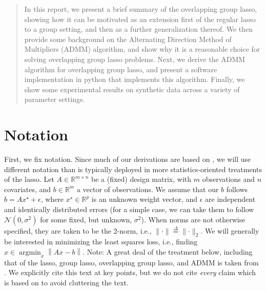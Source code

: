 \documentclass{article}
\begin{document}
\maketitle

\begin{abstract}
  In this report, we present a brief summary of the overlapping group lasso, showing how it can be motivated as an extension first of the regular lasso to a group setting, and then as a further generalization thereof.
  We then provide some background on the Alternating Direction Method of Multipliers (ADMM) algorithm, and show why it is a reasonable choice for solving overlapping group lasso problems.
  Next, we derive the ADMM algorithm for overlapping group lasso, and present a software implementation in python that implements this algorithm.
  Finally, we show some experimental results on synthetic data across a variety of parameter settings.
\end{abstract}

\section{Notation}
\label{sec:notation}

First, we fix notation.
Since much of our derivations are based on \cite{boyd_distributed_2011}, we will use different notation than is typically deployed in more statistics-oriented treatments of the lasso.
Let $A \in \mathbb{R}^{m \times n}$ be a (fixed) design matrix, with $m$ observations and $n$ covariates, and $b \in \mathbb{R}^m$ a vector of observations.
We assume that our $b$ follows $b = A x^{\star} + \epsilon$, where $x^{\star} \in \mathbb{R}^p$ is an unknown weight vector, and $\epsilon$ are independent and identically distributed errors (for a simple case, we can take them to follow $\mathcal{N}(0,\sigma^2)$ for some fixed, but unknown, $\sigma^2$).
When norms are not otherwise specified, they are taken to be the 2-norm, i.e., $\lVert \cdot \rVert \overset{\Delta}{=} \lVert \cdot \rVert_2$.
We will generally be interested in minimizing the least squares loss, i.e., finding $\hat{x} \in \operatorname{argmin}_x \left\| Ax - b \right\|$.
Note: A great deal of the treatment below, including that of the lasso, group lasso, overlapping group lasso, and ADMM is taken from \cite{boyd_distributed_2011}.
We explicitly cite this text at key points, but we do not cite \emph{every} claim which is based on \cite{boyd_distributed_2011} to avoid cluttering the text.
\end{document}
